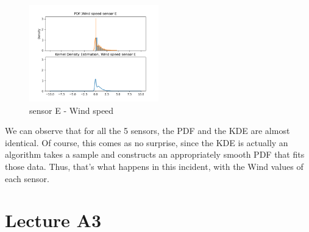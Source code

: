 \documentclass[a4paper,12pt]{article} %
\begin{document}
\begin{figure}[H]   
	\centering 
	\includegraphics[width=0.5\textwidth]{Figure_14.png}
	\caption{sensor E - Wind speed} 
\end{figure}

\setlength{\parindent}{8ex} We can observe that for all the 5 sensors, the PDF and the KDE are almost identical. Of course, this comes as no surprise, since the KDE is actually an algorithm takes a sample and constructs an appropriately smooth PDF that fits those data. Thus, that's what happens in this incident, with the Wind values of each sensor.
\section{Lecture A3}
\end{document}
